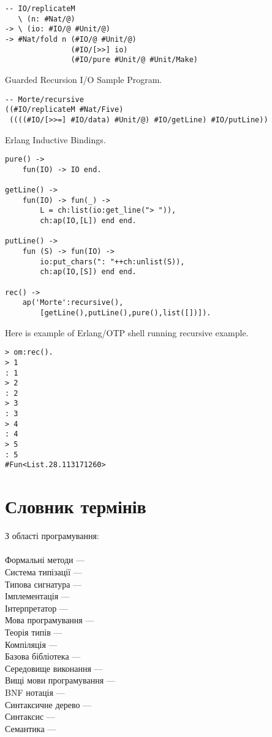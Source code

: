 \begin{lstlisting}[mathescape=true]
-- IO/replicateM
   \ (n: #Nat/@)
-> \ (io: #IO/@ #Unit/@)
-> #Nat/fold n (#IO/@ #Unit/@)
               (#IO/[>>] io)
               (#IO/pure #Unit/@ #Unit/Make)
\end{lstlisting}

Guarded Recursion I/O Sample Program.

\begin{lstlisting}[mathescape=true]
-- Morte/recursive
((#IO/replicateM #Nat/Five)
 ((((#IO/[>>=] #IO/data) #Unit/@) #IO/getLine) #IO/putLine))
\end{lstlisting}

Erlang Inductive Bindings.

\begin{lstlisting}[mathescape=true]
pure() ->
    fun(IO) -> IO end.

getLine() ->
    fun(IO) -> fun(_) ->
        L = ch:list(io:get_line("> ")),
        ch:ap(IO,[L]) end end.

putLine() ->
    fun (S) -> fun(IO) ->
        io:put_chars(": "++ch:unlist(S)),
        ch:ap(IO,[S]) end end.

rec() ->
    ap('Morte':recursive(),
        [getLine(),putLine(),pure(),list([])]).
\end{lstlisting}


Here is example of Erlang/OTP shell running recursive example.

\begin{lstlisting}[mathescape=true]
> om:rec().
> 1
: 1
> 2
: 2
> 3
: 3
> 4
: 4
> 5
: 5
#Fun<List.28.113171260>
\end{lstlisting}

\newpage
\section{Словник термінів}

З області програмування:
\\
\\
Формальні методи --- \\
Система типізації --- \\
Типова сигнатура --- \\
Імплементація --- \\
Інтерпретатор --- \\
Мова програмування --- \\
Теорія типів --- \\
Компіляція --- \\
Базова бібліотека --- \\
Середовище виконання --- \\
Вищі мови програмування --- \\
BNF нотація --- \\
Синтаксичне дерево --- \\
Синтаксис --- \\
Семантика --- \\


